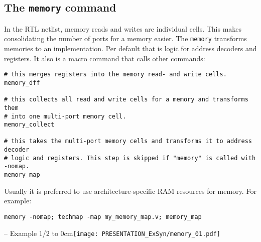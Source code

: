 
\subsection{The {\tt memory} command}

\begin{frame}[fragile]{\subsecname}
In the RTL netlist, memory reads and writes are individual cells. This makes
consolidating the number of ports for a memory easier. The {\tt memory}
transforms memories to an implementation. Per default that is logic for address
decoders and registers. It also is a macro command that calls other commands:

\begin{lstlisting}[xleftmargin=0.5cm, basicstyle=\ttfamily\fontsize{8pt}{10pt}\selectfont, language=ys]
# this merges registers into the memory read- and write cells.
memory_dff

# this collects all read and write cells for a memory and transforms them
# into one multi-port memory cell.
memory_collect

# this takes the multi-port memory cells and transforms it to address decoder
# logic and registers. This step is skipped if "memory" is called with -nomap.
memory_map
\end{lstlisting}

\bigskip
Usually it is preferred to use architecture-specific RAM resources for memory.
For example:

\begin{lstlisting}[xleftmargin=0.5cm, basicstyle=\ttfamily\fontsize{8pt}{10pt}\selectfont, language=ys]
memory -nomap; techmap -map my_memory_map.v; memory_map
\end{lstlisting}
\end{frame}

\begin{frame}[t, fragile]{\subsecname{} -- Example 1/2}
\vbox to 0cm{\texttt{[image: PRESENTATION\_ExSyn/memory\_01.pdf]}\vss}
\vskip-1cm
\begin{columns}
\column[t]{5cm}

\column[t]{5cm}

\end{columns}
\end{frame}

